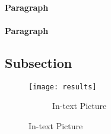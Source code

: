 \lipsum[6] %



\paragraph{Paragraph} \lipsum[7] %



\paragraph{Paragraph} \lipsum[8] %



\subsection{Subsection}

\lipsum[9] %

\begin{figure}[ht]\centering
	\texttt{[image: results]}
	\begin{figure}
		\caption{In-text Picture}
	\end{figure}
	\label{fig:results}
\end{figure}
